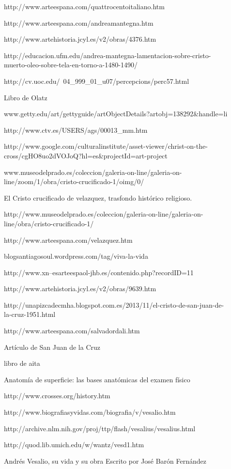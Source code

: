 \begin{description}
\item[] http://www.arteespana.com/quattrocentoitaliano.htm
\item[] http://www.arteespana.com/andreamantegna.htm
\item[] http://www.artehistoria.jcyl.es/v2/obras/4376.htm
\item[] http://educacion.ufm.edu/andrea-mantegna-lamentacion-sobre-cristo-muerto-oleo-sobre-tela-en-torno-a-1480-1490/
\item[] http://cv.uoc.edu/~04\_999\_01\_u07/percepcions/perc57.html
\item[] Libro de Olatz

\item[] www.getty.edu/art/gettyguide/artObjectDetails?artobj=138292\&handle=li
\item[] http://www.ctv.es/USERS/ags/00013\_mm.htm
\item[] http://www.google.com/culturalinstitute/asset-viewer/christ-on-the-cross/cgHO8uo2dVOJoQ?hl=es\&projectId=art-project

\item[] www.museodelprado.es/coleccion/galeria-on-line/galeria-on-line/zoom/1/obra/cristo-crucificado-1/oimg/0/
\item[] El Cristo crucificado de velazquez, trasfondo histórico religioso. 
\item[] http://www.museodelprado.es/coleccion/galeria-on-line/galeria-on-line/obra/cristo-crucificado-1/
\item[] http://www.arteespana.com/velazquez.htm

\item[] blogsantiagosoul.wordpress.com/tag/viva-la-vida
\item[] http://www.xn--esarteespaol-jhb.es/contenido.php?recordID=11
\item[] http://www.artehistoria.jcyl.es/v2/obras/9639.htm
\item[] http://unapizcadecmha.blogspot.com.es/2013/11/el-cristo-de-san-juan-de-la-cruz-1951.html
\item[] http://www.arteespana.com/salvadordali.htm
\item[] Artículo de San Juan de la Cruz
\item[] libro de aita

\item[] Anatomía de superficie: las bases anatómicas del examen físico

\item[] http://www.crosses.org/history.htm

\item[] http://www.biografiasyvidas.com/biografia/v/vesalio.htm
\item[] http://archive.nlm.nih.gov/proj/ttp/flash/vesalius/vesalius.html
\item[] http://quod.lib.umich.edu/w/wantz/vesd1.htm
\item[] Andrés Vesalio, su vida y su obra Escrito por José Barón Fernández

\end{description}